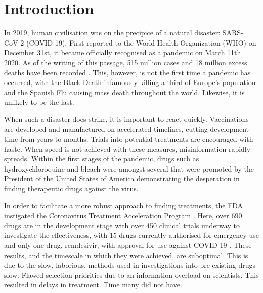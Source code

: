 
\chapter{Introduction}  %

\ifpdf
    \graphicspath{{Chapter1/Figs/Raster/}{Chapter1/Figs/PDF/}{Chapter1/Figs/}}
\else
    \graphicspath{{Chapter1/Figs/Vector/}{Chapter1/Figs/}}
\fi

In 2019, human civilisation was on the precipice of a natural disaster: \mbox{SARS-CoV-2} (\mbox{COVID-19}). First reported to the World Health Organization (WHO) on December 31st, it became officially recognised as a pandemic on March 11th 2020. As of the writing of this passage, 515 million cases and 18 million excess deaths have been recorded \cite{Wan22,WHO22}. This, however, is not the first time a pandemic has occurred, with the Black Death infamously killing a third of Europe's population and the Spanish Flu causing mass death throughout the world. Likewise, it is unlikely to be the last.

When such a disaster does strike, it is important to react quickly. Vaccinations are developed and manufactured on accelerated timelines, cutting development time from years to months. Trials into potential treatments are encouraged with haste. When speed is not achieved with these measures, misinformation rapidly spreads. Within the first stages of the pandemic, drugs such as hydroxychloroquine and bleach were amongst several that were promoted by the President of the United States of America demonstrating the desperation in finding therapeutic drugs against the virus.

In order to facilitate a more robust approach to finding treatments, the FDA instigated the Coronavirus Treatment Acceleration Program \cite{CTAP22}. Here, over 690 drugs are in the development stage with over 450 clinical trials underway to investigate the effectiveness, with 15 drugs currently authorised for emergency use and only one drug, remdesivir, with approval for use against \mbox{COVID-19} \cite{CTAP22}. These results, and the timescale in which they were achieved, are suboptimal. This is due to the slow, laborious, methods used in investigations into pre-existing drugs slow. Flawed selection priorities due to an information overload on scientists. This resulted in delays in treatment. Time many did not have.


